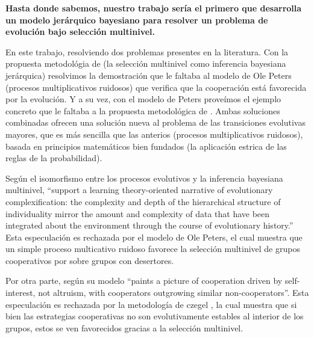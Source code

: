 \documentclass[a4paper,10pt]{article}
\begin{document}
\textbf{Hasta donde sabemos, nuestro trabajo sería el primero que desarrolla un modelo jerárquico bayesiano para resolver un problema de evolución bajo selección multinivel.}



En este trabajo, resolviendo dos problemas presentes en la literatura.
Con la propuesta metodológia de \cite{czegel2019-bayesianEvolution} (la selección multinivel como inferencia bayesiana jerárquica) resolvimos la demostración que le faltaba al modelo de Ole Peters (procesos multiplicativos ruidosos) que verifica que la cooperación está favorecida por la evolución.
Y a su vez, con el modelo de Peters proveímos el ejemplo concreto que le faltaba a la propuesta metodológica de \cite{czegel2019-bayesianEvolution}.
Ambas soluciones combinadas ofrecen una solución nueva al problema de las transiciones evolutivas mayores, que es más sencilla que las anterios (procesos multiplicativos ruidosos), basada en principios matemáticos bien fundados (la aplicación estrica de las reglas de la probabilidad).

Según \cite{czegel2019-bayesianEvolution} el isomorfismo entre los procesos evolutivos y la inferencia bayesiana multinivel,  ``support a learning theory-oriented narrative of evolutionary complexification: the complexity and depth of the hierarchical structure of individuality mirror the amount and complexity of data that have been integrated about the environment through the course of evolutionary history.''
Esta especulación es rechazada por el modelo de Ole Peters, el cual muestra que un simple proceso multicativo ruidoso favorece la selección multinivel de grupos cooperativos por sobre grupos con desertores.

Por otra parte, según \cite{peters-cooperation2019.03.04} su modelo ``paints a picture of cooperation driven by self-interest, not altruism, with cooperators outgrowing similar non-cooperators''.
Esta especulación es rechazada por la metodología de czegel \cite{czegel2019-bayesianEvolution}, la cual muestra que si bien las estrategias cooperativas no son evolutivamente estables al interior de los grupos, estos se ven favorecidos gracias a la selección multinivel.
\end{document}
